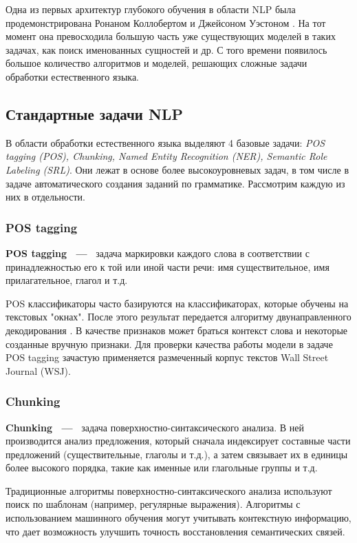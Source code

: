 Одна из первых архитектур глубокого обучения в области NLP была продемонстрирована Ронаном Коллобертом и Джейсоном Уэстоном \autocite{DBLP:journals/corr/abs-1103-0398}. На тот момент она превосходила большую часть уже существующих моделей в таких задачах, как поиск именованных сущностей и др. С того времени появилось большое количество алгоритмов и моделей, решающих сложные задачи обработки естественного языка.

\subsection{Стандартные задачи NLP}
\label{subsec:standard}
В области обработки естественного языка выделяют 4 базовые задачи:\emph{ POS tagging (POS), Chunking, Named Entity Recognition (NER), Semantic Role Labeling (SRL)}. Они лежат в основе более высокоуровневых задач, в том числе в задаче автоматического создания заданий по грамматике. Рассмотрим каждую из них в отдельности.
\subsubsection{POS tagging}
\textbf{POS tagging ~---~} задача маркировки каждого слова в соответствии с принадлежностью его к той или иной части речи: имя существительное, имя прилагательное, глагол и т.д.

POS классификаторы часто базируются на классификаторах, которые обучены на текстовых "окнах". После этого результат передается алгоритму двунаправленного декодирования \autocite{watanabe-sumita-2002-bidirectional}. В качестве признаков может браться контекст слова и некоторые созданные вручную признаки.
Для проверки качества работы модели в задаче POS tagging зачастую применяется размеченный корпус текстов Wall Street Journal (WSJ).
\subsubsection{Chunking}
\textbf{Chunking  ~---~} задача поверхностно-синтаксического анализа. В  ней производится анализ предложения, который сначала индексирует составные части предложений (существительные, глаголы и т.д.), а затем связывает их в единицы более высокого порядка, такие как именные или глагольные группы и т.д.

Традиционные алгоритмы поверхностно-синтаксического анализа используют поиск по шаблонам (например, регулярные выражения). Алгоритмы с использованием машинного обучения могут учитывать контекстную информацию, что дает возможность улучшить точность восстановления семантических связей.
